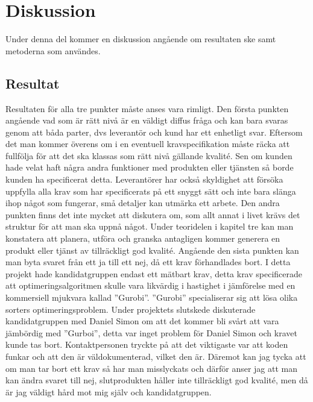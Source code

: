\section{Diskussion}
Under denna del kommer en diskussion angående om resultaten ske samt metoderna som användes.
\subsection{Resultat}
Resultaten för alla tre punkter måste anses vara rimligt. Den första punkten angående vad som är rätt nivå är en väldigt diffus fråga och kan bara svaras genom att båda parter, dvs leverantör och kund har ett enhetligt svar. Eftersom det man kommer överens om i en eventuell kravspecifikation måste räcka att fullfölja för att det ska klassas som rätt nivå gällande kvalité. Sen om kunden hade velat haft några andra funktioner med produkten eller tjänsten så borde kunden ha specificerat detta. Leverantörer har också skyldighet att försöka uppfylla alla krav som har specificerats på ett snyggt sätt och inte bara slänga ihop något som fungerar, små detaljer kan utmärka ett arbete.
\newline
\newline
Den andra punkten finns det inte mycket att diskutera om, som allt annat i livet krävs det struktur för att man ska uppnå något. Under teoridelen i kapitel tre kan man konstatera att planera, utföra och granska antagligen kommer generera en produkt eller tjänst av tillräckligt god kvalité.
\newline
\newline
Angående den sista punkten kan man byta svaret från ett ja till ett nej, då ett krav förhandlades bort. I detta projekt hade kandidatgruppen endast ett mätbart krav, detta krav specificerade att optimeringsalgoritmen skulle vara likvärdig i hastighet i jämförelse med en kommersiell mjukvara kallad ''Gurobi''. ''Gurobi'' specialiserar sig att lösa olika sorters optimeringsproblem. Under projektets slutskede diskuterade kandidatgruppen med Daniel Simon om att det kommer bli svårt att vara jämbördig med ''Gurboi'', detta var inget problem för Daniel Simon och kravet kunde tas bort. Kontaktpersonen tryckte på att det viktigaste var att koden funkar och att den är väldokumenterad, vilket den är. Däremot kan jag tycka att om man tar bort ett krav så har man misslyckats och därför anser jag att man kan ändra svaret till nej, slutprodukten håller inte tillräckligt god kvalité, men då är jag väldigt hård mot mig själv och kandidatgruppen.

